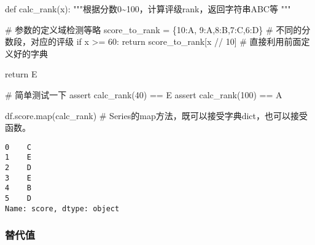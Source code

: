 \documentclass[
  letterpaper,
  DIV=11,
  numbers=noendperiod]{scrreprt}
\newenvironment{Shaded}{\begin{snugshade}}{\end{snugshade}}
\newcommand{\BuiltInTok}[1]{\textcolor[rgb]{0.00,0.23,0.31}{#1}}
\newcommand{\CommentTok}[1]{\textcolor[rgb]{0.37,0.37,0.37}{#1}}
\newcommand{\ControlFlowTok}[1]{\textcolor[rgb]{0.00,0.23,0.31}{#1}}
\newcommand{\DecValTok}[1]{\textcolor[rgb]{0.68,0.00,0.00}{#1}}
\newcommand{\KeywordTok}[1]{\textcolor[rgb]{0.00,0.23,0.31}{#1}}
\newcommand{\NormalTok}[1]{\textcolor[rgb]{0.00,0.23,0.31}{#1}}
\newcommand{\OperatorTok}[1]{\textcolor[rgb]{0.37,0.37,0.37}{#1}}
\newcommand{\StringTok}[1]{\textcolor[rgb]{0.13,0.47,0.30}{#1}}
\begin{document}
\begin{Shaded}
\begin{Highlighting}[]
\KeywordTok{def}\NormalTok{ calc\_rank(x):}
    \CommentTok{"""根据分数0\textasciitilde{}100，计算评级rank，返回字符串ABC等}
\CommentTok{    """}

    \CommentTok{\# 参数的定义域检测等略}
\NormalTok{    score\_to\_rank }\OperatorTok{=}\NormalTok{ \{}\DecValTok{10}\NormalTok{:}\StringTok{\textquotesingle{}A\textquotesingle{}}\NormalTok{, }\DecValTok{9}\NormalTok{:}\StringTok{\textquotesingle{}A\textquotesingle{}}\NormalTok{,}\DecValTok{8}\NormalTok{:}\StringTok{\textquotesingle{}B\textquotesingle{}}\NormalTok{,}\DecValTok{7}\NormalTok{:}\StringTok{\textquotesingle{}C\textquotesingle{}}\NormalTok{,}\DecValTok{6}\NormalTok{:}\StringTok{\textquotesingle{}D\textquotesingle{}}\NormalTok{\} }\CommentTok{\# 不同的分数段，对应的评级}
    \ControlFlowTok{if}\NormalTok{ x }\OperatorTok{\textgreater{}=} \DecValTok{60}\NormalTok{:}
        \ControlFlowTok{return}\NormalTok{ score\_to\_rank[x }\OperatorTok{//} \DecValTok{10}\NormalTok{] }\CommentTok{\# 直接利用前面定义好的字典}
    
    \ControlFlowTok{return} \StringTok{\textquotesingle{}E\textquotesingle{}}

\CommentTok{\# 简单测试一下}
\ControlFlowTok{assert}\NormalTok{ calc\_rank(}\DecValTok{40}\NormalTok{) }\OperatorTok{==} \StringTok{\textquotesingle{}E\textquotesingle{}}
\ControlFlowTok{assert}\NormalTok{ calc\_rank(}\DecValTok{100}\NormalTok{) }\OperatorTok{==} \StringTok{\textquotesingle{}A\textquotesingle{}}
\end{Highlighting}
\end{Shaded}

\begin{Shaded}
\begin{Highlighting}[]

\NormalTok{df.score.}\BuiltInTok{map}\NormalTok{(calc\_rank) }\CommentTok{\# Series的map方法，既可以接受字典dict，也可以接受函数。}
\end{Highlighting}
\end{Shaded}

\begin{verbatim}
0    C
1    E
2    D
3    E
4    B
5    D
Name: score, dtype: object
\end{verbatim}

\hypertarget{ux66ffux4ee3ux503c}{%
\subsubsection{替代值}\label{ux66ffux4ee3ux503c}}
\end{document}
